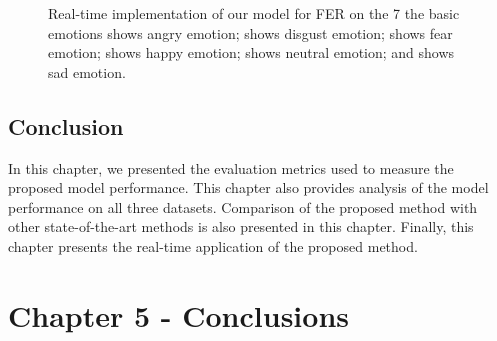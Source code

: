 \documentclass[master]{thesis-uestc}
\begin{document}
\begin{figure}
%
\hspace{8pt}%

\caption[Real-time implementation of the model for FER on the 7 the basic emotions]{Real-time implementation of our model for FER on the 7 the basic emotions
 shows angry emotion;
 shows disgust emotion;
 shows fear emotion;
 shows happy emotion;
 shows neutral emotion; and
 shows sad emotion.}
\label{fig:implementation}%
\end{figure}

\section{Conclusion}
In this chapter, we presented the evaluation metrics used to measure the proposed model performance. This chapter also provides analysis of the model performance on all three datasets. Comparison of the proposed method with other state-of-the-art methods is also presented in this chapter. Finally, this chapter presents the real-time application of the proposed method. 

\chapter{Chapter 5 - Conclusions}
\end{document}
